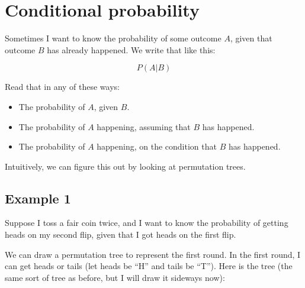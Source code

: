 \documentclass[../../../main.tex]{subfiles}
\begin{document}
\chapter{Conditional probability}

Sometimes I want to know the probability of some outcome $A$, given that outcome $B$ has already happened. We write that like this:

\begin{equation*}
  P(A | B)
\end{equation*}

\noindent
Read that in any of these ways:

\begin{itemize}
  \item The probability of $A$, given $B$.
  \item The probability of $A$ happening, assuming that $B$ has happened.
  \item The probability of $A$ happening, on the condition that $B$ has happened.
\end{itemize}

\noindent
Intuitively, we can figure this out by looking at permutation trees.


\section{Example 1}

Suppose I toss a fair coin twice, and I want to know the probability of getting heads on my second flip, given that I got heads on the first flip. 

We can draw a permutation tree to represent the first round. In the first round, I can get heads or tails (let heads be ``H'' and tails be ``T''). Here is the tree (the same sort of tree as before, but I will draw it sideways now):

\begin{center}
\end{center}
\end{document}
